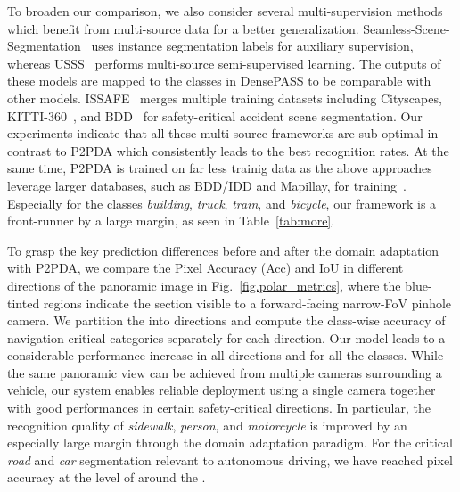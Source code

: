 \documentclass[journal]{IEEEtran}
\begin{document}

To broaden our comparison, we also consider several multi-supervision methods which benefit from multi-source data for a better generalization.
Seamless-Scene-Segmentation~\cite{seamless} uses instance segmentation labels for auxiliary supervision, whereas USSS~\cite{usss} performs multi-source semi-supervised learning.
The outputs of these models are mapped to the  classes in DensePASS to be comparable with other models.
ISSAFE~\cite{issafe} merges multiple training datasets including Cityscapes, KITTI-360~\cite{kitti360}, and BDD~\cite{bdd} for safety-critical accident scene segmentation.
Our experiments indicate that  all these multi-source frameworks are sub-optimal in contrast to P2PDA which consistently leads to the best recognition rates. 
At the same time, P2PDA is trained on far less trainig data as the above approaches leverage larger databases, such as BDD/IDD and Mapillay, for training~\cite{issafe,omnirange}.
Especially for the classes \emph{building}, \emph{truck}, \emph{train}, and \emph{bicycle}, our framework is a front-runner by a large margin, as seen in Table~\ref{tab:more}.

To grasp the key prediction differences before and after the domain adaptation with P2PDA, we compare the Pixel Accuracy (Acc) and IoU in different directions of the panoramic image in Fig.~\ref{fig.polar_metrics}, where the blue-tinted regions indicate the section visible to a forward-facing narrow-FoV pinhole camera.
We partition the  into  directions and compute the class-wise accuracy of navigation-critical categories separately for each direction.
Our model leads to a considerable performance increase in all directions and for all the classes.
While the same panoramic view can be achieved from multiple cameras surrounding a vehicle, our system enables reliable deployment using a single camera together with good performances in certain safety-critical directions.
In particular, the recognition quality of \emph{sidewalk}, \emph{person}, and \emph{motorcycle} is improved by an especially large margin through the domain adaptation paradigm.
For the critical \emph{road} and \emph{car} segmentation relevant to autonomous driving, we have reached pixel accuracy at the level of  around the .
\end{document}
